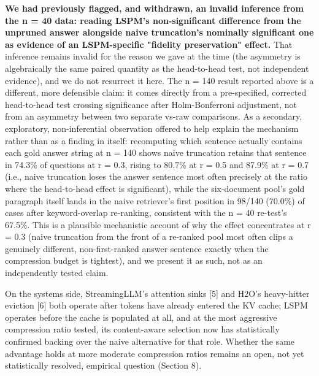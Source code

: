 \textbf{We had previously flagged, and withdrawn, an invalid inference from the n = 40 data: reading LSPM's non-significant difference from the unpruned answer alongside naive truncation's nominally significant one as evidence of an LSPM-specific "fidelity preservation" effect.} That inference remains invalid for the reason we gave at the time (the asymmetry is algebraically the same paired quantity as the head-to-head test, not independent evidence), and we do not resurrect it here. The n = 140 result reported above is a different, more defensible claim: it comes directly from a pre-specified, corrected head-to-head test crossing significance after Holm-Bonferroni adjustment, not from an asymmetry between two separate vs-raw comparisons. As a secondary, exploratory, non-inferential observation offered to help explain the mechanism rather than as a finding in itself: recomputing which sentence actually contains each gold answer string at n = 140 shows naive truncation retains that sentence in 74.3\% of questions at r = 0.3, rising to 80.7\% at r = 0.5 and 87.9\% at r = 0.7 (i.e., naive truncation loses the answer sentence most often precisely at the ratio where the head-to-head effect is significant), while the six-document pool's gold paragraph itself lands in the naive retriever's first position in 98/140 (70.0\%) of cases after keyword-overlap re-ranking, consistent with the n = 40 re-test's 67.5\%. This is a plausible mechanistic account of why the effect concentrates at r = 0.3 (naive truncation from the front of a re-ranked pool most often clips a genuinely different, non-first-ranked answer sentence exactly when the compression budget is tightest), and we present it as such, not as an independently tested claim.

On the systems side, StreamingLLM's attention sinks [5] and H2O's heavy-hitter eviction [6] both operate after tokens have already entered the KV cache; LSPM operates before the cache is populated at all, and at the most aggressive compression ratio tested, its content-aware selection now has statistically confirmed backing over the naive alternative for that role. Whether the same advantage holds at more moderate compression ratios remains an open, not yet statistically resolved, empirical question (Section 8).

